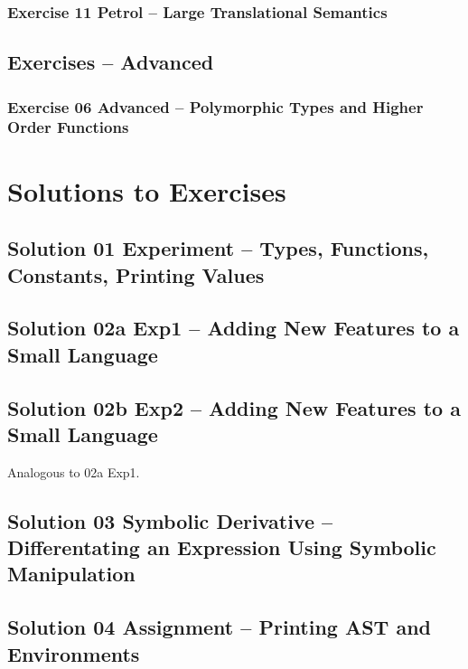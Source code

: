 \documentclass[10.5pt,a4]{article}
\begin{document}
\subsubsection{Exercise 11 Petrol – Large Translational Semantics}


\subsection{Exercises – Advanced}
\subsubsection{Exercise 06 Advanced – Polymorphic Types and Higher Order Functions}

\lstset{language=modelica}

\section{Solutions to Exercises}

\subsection{Solution 01 Experiment – Types, Functions, Constants, Printing Values}


\subsection{Solution 02a Exp1 –  Adding New Features to a Small Language}


\subsection{Solution 02b Exp2 –  Adding New Features to a Small Language}
Analogous to 02a Exp1.

\subsection{Solution 03 Symbolic Derivative –  Differentating an Expression Using Symbolic Manipulation}


\subsection{Solution 04 Assignment – Printing AST and Environments}

\end{document}
